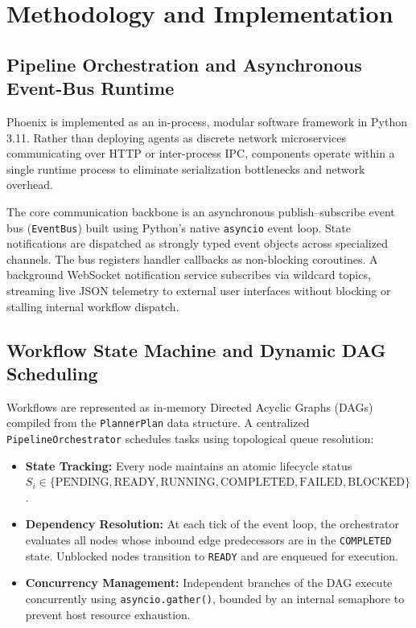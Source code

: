 \documentclass[conference]{IEEEtran}
\begin{document}
\section{Methodology and Implementation}
\subsection{Pipeline Orchestration and Asynchronous Event-Bus Runtime}
Phoenix is implemented as an in-process, modular software framework in Python 3.11. Rather than deploying agents as discrete network microservices communicating over HTTP or inter-process IPC, components operate within a single runtime process to eliminate serialization bottlenecks and network overhead.

The core communication backbone is an asynchronous publish--subscribe event bus (\texttt{EventBus}) built using Python's native \texttt{asyncio} event loop. State notifications are dispatched as strongly typed event objects across specialized channels. The bus registers handler callbacks as non-blocking coroutines. A background WebSocket notification service subscribes via wildcard topics, streaming live JSON telemetry to external user interfaces without blocking or stalling internal workflow dispatch.

\subsection{Workflow State Machine and Dynamic DAG Scheduling}
Workflows are represented as in-memory Directed Acyclic Graphs (DAGs) compiled from the \texttt{PlannerPlan} data structure. A centralized \texttt{PipelineOrchestrator} schedules tasks using topological queue resolution:
\begin{itemize}
    \item \textbf{State Tracking:} Every node maintains an atomic lifecycle status $S_i \in \{\text{PENDING}, \text{READY}, \text{RUNNING}, \text{COMPLETED}, \text{FAILED}, \text{BLOCKED}\}$.
    \item \textbf{Dependency Resolution:} At each tick of the event loop, the orchestrator evaluates all nodes whose inbound edge predecessors are in the \texttt{COMPLETED} state. Unblocked nodes transition to \texttt{READY} and are enqueued for execution.
    \item \textbf{Concurrency Management:} Independent branches of the DAG execute concurrently using \texttt{asyncio.gather()}, bounded by an internal semaphore to prevent host resource exhaustion.
\end{itemize}
\end{document}
